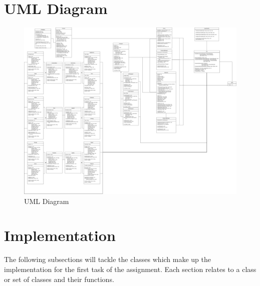 \documentclass[12pt, a4paper]{report}
\begin{document}
\section{UML Diagram}
\begin{figure}[!htp]
  \centering
    \includegraphics[width=15cm]{Images/OOP UML Diagram.drawio.png}
    \caption{UML Diagram}
  \hfill
\end{figure}

\section{Implementation}
The following subsections will tackle the classes which make up the implementation for the first task of the assignment. Each section relates to a class or set of classes and their functions. 
\end{document}
